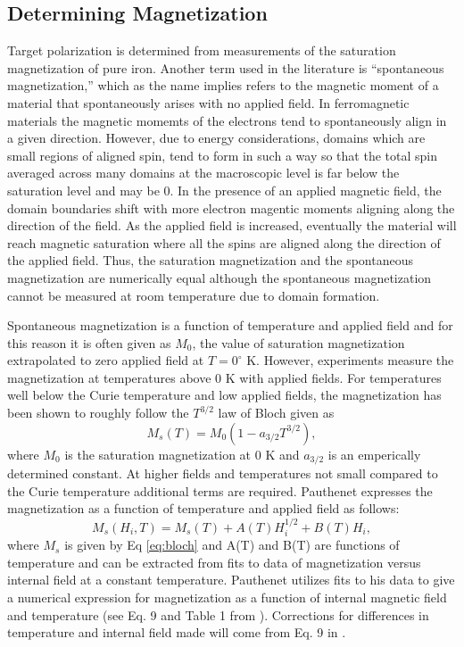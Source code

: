 \documentclass[12pt]{article}
\begin{document}
\subsection{Determining Magnetization}\label{method}
Target polarization is determined from measurements of the saturation magnetization of pure iron. Another term used in the literature is ``spontaneous magnetization,'' which as the name implies refers to the magnetic moment of a material that spontaneously arises with no applied field. In ferromagnetic materials the magnetic momemts of the electrons tend to spontaneously align in a given direction. However, due to energy considerations, domains which are small regions of aligned spin, tend to form in such a way so that the total spin averaged across many domains at the macroscopic level is far below the saturation level and may be 0. In the presence of an applied magnetic field, the domain boundaries shift with more electron magentic moments aligning along the direction of the field. As the applied field is increased, eventually the material will reach magnetic saturation where all the spins are aligned along the direction of the applied field. Thus, the saturation magnetization and the spontaneous magnetization are numerically equal although the spontaneous magnetization cannot be measured at room temperature due to domain formation. 

Spontaneous magnetization is a function of temperature and applied field and for this reason it is often given as $M_{0}$, the value of saturation magnetization extrapolated to zero applied field at $T = 0^{\circ}$ K. However, experiments measure the magnetization at temperatures above 0 K with applied fields. For temperatures well below the Curie temperature and low applied fields, the magnetization has been shown to roughly follow the $T^{3/2}$ law of Bloch given as \cite{Bloch1930}
\begin{equation}
M_s(T) = M_0(1-a_{3/2}T^{3/2}),
\label{eq:bloch}
\end{equation}
where $M_0$ is the saturation magnetization at 0 K and $a_{3/2}$ is an emperically determined constant. At higher fields and temperatures not small compared to the Curie temperature additional terms are required\cite{PauthenetNov1982}. Pauthenet expresses the magnetization as a function of temperature and applied field as follows:\cite{PauthenetMar1982,PauthenetNov1982}
\begin{equation}
M_s(H_i, T) = M_s(T)+A(T)H_i^{1/2}+B(T)H_i,
\label{eq:pauthenet}
\end{equation}
where $M_s$ is given by Eq \ref{eq:bloch} and A(T) and B(T) are functions of temperature and can be extracted from fits to data of magnetization versus internal field at a constant temperature. Pauthenet utilizes fits to his data to give a numerical expression for magnetization as a function of internal magnetic field and temperature (see Eq. 9 and Table 1 from \cite{PauthenetMar1982}). Corrections for differences in temperature and internal field made will come from Eq. 9 in \cite{PauthenetMar1982}.
\end{document}

